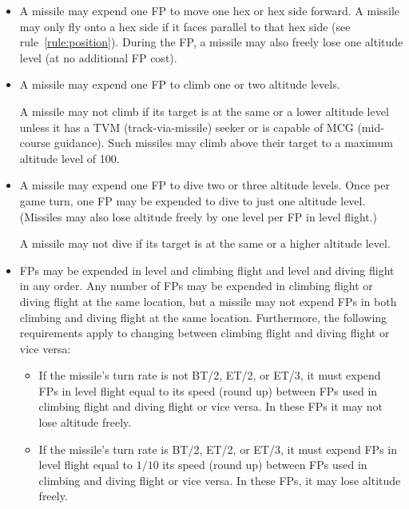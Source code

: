{

\begin{itemize}

    \item {} A missile may expend one FP to move one hex or hex side forward. A missile may only fly onto a hex side if it faces parallel to that hex side (see rule~\ref{rule:position}). During the FP, a missile may also freely lose one altitude level (at no additional FP cost).

    \item {} A missile may expend one FP to climb one or two altitude levels. 
    
    A missile may not climb if its target is at the same or a lower altitude level unless it has a TVM (track-via-missile) seeker or is capable of MCG (mid-course guidance). Such missiles may climb above their target to a maximum altitude level of 100.

    \item {} A missile may expend one FP to dive two or three altitude levels. Once per game turn, one FP may be expended to dive to just one altitude level. (Missiles may also lose altitude freely by one level per FP in level flight.)

    A missile may not dive if its target is at the same or a higher altitude level.

    \item {} FPs may be expended in level and climbing flight and level and diving flight in any order. Any number of FPs may be expended in climbing flight or diving flight at the same location, but a missile may not expend FPs in both climbing and diving flight at the same location. Furthermore, the following requirements apply to changing between climbing flight and diving flight or vice versa:


    \begin{itemize}

        \item If the missile's turn rate is not BT/2, ET/2, or ET/3, it must expend FPs in level flight equal to {\onethird} its speed (round up) between FPs used in climbing flight and diving flight or vice versa. In these FPs it may not lose altitude freely.
        
        \item If the missile's turn rate is BT/2, ET/2, or ET/3, it must expend FPs in level flight equal to $1/10$ its speed (round up)  between FPs used in climbing and diving flight or vice versa. In these FPs, it may lose altitude freely.


\end{itemize}
\end{itemize}}
